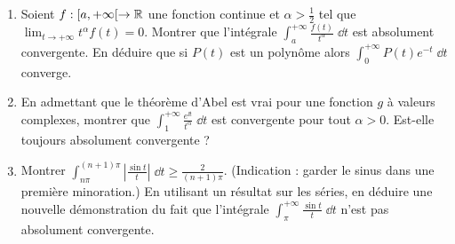 \begin{frame}
\begin{miniexercice}
	\begin{enumerate}

 
  \item Soient $f :[a,+\infty[ \to \mathbb{R}$ une fonction continue et $\alpha > \frac12$
  tel que $\lim_{t\to+\infty} t^\alpha f(t) = 0$.
  Montrer que l'intégrale $\int_a^{+\infty} \frac{f(t)}{t^\alpha}\;\dd t$ est  absolument convergente.
  En déduire que si $P(t)$ est un polynôme alors
  $\int_0^{+\infty} P(t)e^{-t}\;\dd t$ converge.


  \item En admettant que le théorème d'Abel est vrai pour une fonction $g$ à valeurs complexes,
  montrer que $\int_1^{+\infty} \frac{e^{\ii t}}{t^\alpha}\; \dd t$ est convergente pour tout $\alpha > 0$.
  Est-elle toujours absolument convergente ?
  
  \item Montrer $\int_{n\pi}^{(n+1)\pi} \left|\frac{\sin t}{t}\right| \;\dd t \ge \frac{2}{(n+1)\pi}$.
  (Indication : garder le sinus dans une première minoration.)
  En utilisant un résultat sur les séries, en déduire une nouvelle démonstration du fait 
  que l'intégrale $\int_\pi^{+\infty} \frac{\sin t}{t} \;\dd t$ n'est pas absolument convergente. 
\end{enumerate}

\end{miniexercice}	
\end{frame}






